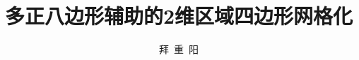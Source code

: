 \documentclass[bachelor,twoside,openright]{ustcthesis}
\title{多正八边形辅助的2维区域四边形网格化}%
\author{拜\ 重\ 阳}
\begin{document}
  \maketitle

\frontmatter
\makeatletter
\ifustc@bachelor
	
	
	\tableofcontents

	\ustclot
	\ustclof
	\ustcloa
	
\else
	\tableofcontents

	
\fi
\makeatother

\mainmatter
  
  
  

\backmatter


  


  \makeatletter
  \ifustc@bachelor\relax\else
    
  \fi
  \makeatother
\end{document}
